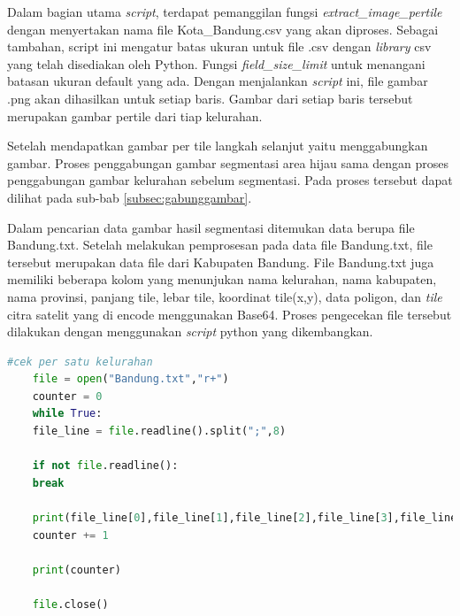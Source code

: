 Dalam bagian utama \textit{script}, terdapat pemanggilan fungsi \textit{extract\_image\_pertile }dengan menyertakan nama file Kota\_Bandung.csv yang akan diproses. Sebagai tambahan, script ini mengatur batas ukuran untuk file .csv dengan \textit{library } csv yang telah disediakan oleh Python. Fungsi \textit{field\_size\_limit} untuk menangani batasan ukuran default yang ada. Dengan menjalankan \textit{script} ini, file gambar .png akan dihasilkan untuk setiap baris. Gambar dari setiap baris tersebut merupakan gambar pertile dari tiap kelurahan.

Setelah mendapatkan gambar per tile langkah selanjut yaitu menggabungkan gambar. Proses penggabungan gambar segmentasi area hijau sama dengan proses penggabungan gambar kelurahan sebelum segmentasi. Pada proses tersebut dapat dilihat pada sub-bab \ref{subsec:gabunggambar}.

Dalam pencarian data gambar hasil segmentasi ditemukan data berupa file Bandung.txt. Setelah melakukan pemprosesan pada data file Bandung.txt, file tersebut merupakan data file dari Kabupaten Bandung. File Bandung.txt juga memiliki beberapa kolom yang menunjukan nama kelurahan, nama kabupaten, nama provinsi, panjang tile, lebar tile, koordinat tile(x,y), data poligon, dan  \textit{tile} citra satelit yang di encode menggunakan Base64. Proses pengecekan file tersebut dilakukan dengan menggunakan \textit{script} python yang dikembangkan.

\begin{lstlisting}[language=Python, caption=Script Pengecekan File .txt,label={code:cekData}]
	#cek per satu kelurahan
	file = open("Bandung.txt","r+")
	counter = 0
	while True:
	file_line = file.readline().split(";",8)
	
	if not file.readline():
	break
	
	print(file_line[0],file_line[1],file_line[2],file_line[3],file_line[4],file_line[5],file_line[6],file_line[7])
	counter += 1

	print(counter)
	
	file.close()
\end{lstlisting}

